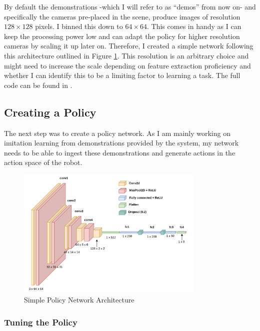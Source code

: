 \noindent By default the demonstrations -which I will refer to as ``demos'' from now on- and specifically the cameras pre-placed in the scene, produce images of resolution $128 \times 128$ pixels. I binned this down to $64 \times 64$. This comes in handy as I can keep the processing power low and can adapt the policy for higher resolution cameras by scaling it up later on. Therefore, I created a simple network following this architecture outlined in Figure \ref{fig:policy-arch}. This resolution is an arbitrary choice and might need to increase the scale depending on feature extraction proficiency and whether I can identify this to be a limiting factor to learning a task. The full code can be found in .

\subsection{Creating a Policy}

The next step was to create a policy network. As I am mainly working on imitation learning from demonstrations provided by the system, my network needs to be able to ingest these demonstrations and generate actions in the action space of the robot. \par

\begin{figure}[h]
  \centering
  \includegraphics[width=0.8\textwidth]{assets/early-work/cnn-encoder-policy-head.png}
  \caption{Simple Policy Network Architecture}\label{fig:policy-arch}
\end{figure}


\subsubsection{Tuning the Policy}

